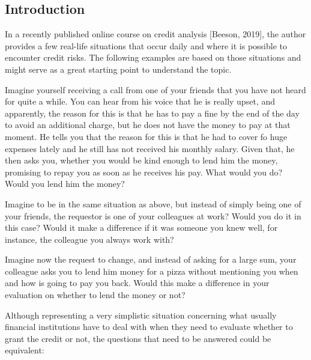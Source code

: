 \documentclass[a4paper,12pt]{article}
\begin{document}
    \subsection[]{Introduction} 
    
    In a recently published online course on credit analysis [Beeson, 2019], 
    the author provides a few real-life situations that occur daily and where it is possible to encounter credit risks. 
    The following examples are based on those situations and might serve as a great starting point to understand the topic. 
    
    \begin{example}
        Imagine yourself receiving a call from one of your friends that you have not heard for quite a while. 
        You can hear from his voice that he is really upset, and apparently, the reason for this is that 
        he has to pay a fine by the end of the day to avoid an additional charge, but he does not have the money 
        to pay at that moment. He tells you that the reason for this is that he had to cover fo huge expenses lately 
        and he still has not received his monthly salary. Given that, he then asks you, whether you would be kind enough to lend 
        him the money, promising to repay you as soon as he receives his pay. What would you do? Would you lend him the money? 
    \end{example} 

    \begin{example}
        Imagine to be in the same situation as above, but instead of simply being one of your friends, 
        the requestor is one of your colleagues at work? Would you do it in this case? Would it make a 
        difference if it was someone you knew well, for instance, the colleague you always work with? 
    \end{example}

    \begin{example}
        Imagine now the request to change, and instead of asking for a large sum, your colleague asks you to lend
        him money for a pizza without mentioning you when and how is going to pay you back. Would this make a difference 
        in your evaluation on whether to lend the money or not?
    \end{example}

 
    Although representing a very simplistic situation concerning what usually financial institutions have to deal with 
    when they need to evaluate whether to grant the credit or not, the questions that need to be answered could be equivalent: 
\end{document}
